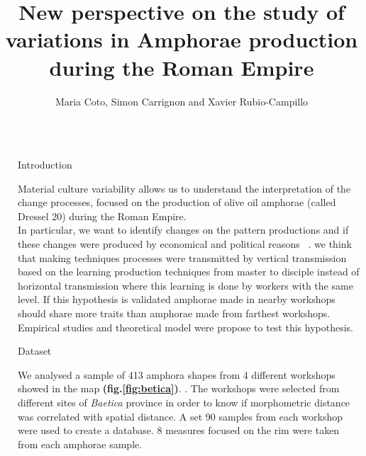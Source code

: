 \documentclass[final]{beamer}
\title{New perspective on the study of variations in Amphorae production during the Roman Empire} %
\author{Maria Coto, Simon Carrignon and Xavier Rubio-Campillo} %
\institute{Barcelona Supercomputing Center - University of Barcelona} %
\newlength{\sepwid}
\newlength{\onecolwid}
\begin{document}

\setlength{\belowcaptionskip}{2ex} %
\setlength\belowdisplayshortskip{2ex} %

\begin{frame}[t] %

\begin{columns}[t] %

\begin{column}{\sepwid}\end{column} %

\begin{column}{\onecolwid} %


\begin{block}{Introduction}

Material culture variability allows us to understand the interpretation of the change processes, focused on the production of olive oil amphorae (called Dressel 20) during the Roman Empire. \\
In particular, we want to identify changes on the pattern productions and if these changes were produced by economical and political reasons ~\cite{schillinger}. we think that making techniques processes were transmitted by vertical transmission based on the learning production techniques from master to disciple instead of horizontal transmission where this learning is done by workers with the same level. If this hypothesis is validated amphorae made in nearby workshops should share more traits than amphorae made from farthest workshops. Empirical studies and theoretical model were propose to test this hypothesis.

\end{block}


\begin{block}{Dataset}


We analysed a sample of 413 amphora shapes from 4 different workshops showed in the map \textbf{(fig.\ref{fig:betica})}. . The workshops were selected from different sites of \emph{Baetica} province in order to know if morphometric distance was correlated with spatial distance. A set 90 samples from each workshop were used to create a database. 8 measures focused on the rim were taken from each amphorae sample. 



\end{block}
\end{column}
\end{columns}
\end{frame}
\end{document}

